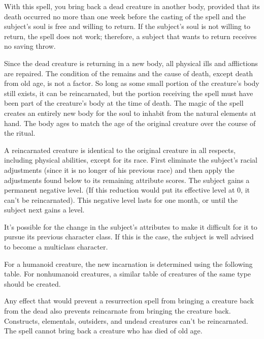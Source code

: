 \spelleffect With this spell, you bring back a dead creature in another body, provided that its death occurred no more than one week before the casting of the spell and the subject's soul is free and willing to return. If the subject's soul is not willing to return, the spell does not work; therefore, a subject that wants to return receives no saving throw.
\par Since the dead creature is returning in a new body, all physical ills and afflictions are repaired. The condition of the remains and the cause of death, except death from old age, is not a factor. So long as some small portion of the creature's body still exists, it can be reincarnated, but the portion receiving the spell must have been part of the creature's body at the time of death. The magic of the spell creates an entirely new body for the soul to inhabit from the natural elements at hand. The body ages to match the age of the original creature over the course of the ritual.
\par A reincarnated creature is identical to the original creature in all respects, including physical abilities, except for its race. First eliminate the subject's racial adjustments (since it is no longer of his previous race) and then apply the adjustments found below to its remaining attribute scores. The subject gains a permanent negative level. (If this reduction would put its effective level at 0, it can't be reincarnated). This negative level lasts for one month, or until the subject next gains a level.
\par It's possible for the change in the subject's attributes to make it difficult for it to pursue its previous character class. If this is the case, the subject is well advised to become a multiclass character.
\par For a humanoid creature, the new incarnation is determined using the following table. For nonhumanoid creatures, a similar table of creatures of the same type should be created.
\par Any effect that would prevent a resurrection spell from bringing a creature back from the dead also prevents reincarnate from bringing the creature back. Constructs, elementals, outsiders, and undead creatures can't be reincarnated. The spell cannot bring back a creature who has died of old age.
